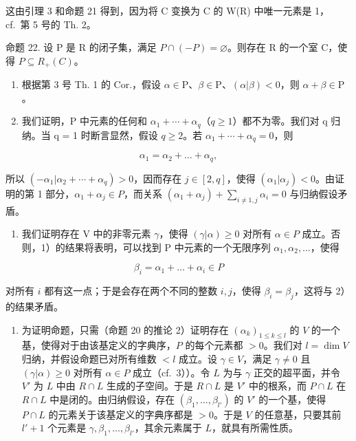 这由引理 3 和命题 21 得到，因为将 C 变换为 C 的 W(R) 中唯一元素是 1，cf.~第 5 号的 Th. 2。

命题 22. 设 P 是 R 的闭子集，满足 \(P \cap (-P) = \varnothing\)。则存在 R 的一个室 C，使得 \(P \subseteq R_{+}(C)\)。

\begin{enumerate}
\def\labelenumi{\arabic{enumi})}
\item
  根据第 3 号 Th. 1 的 Cor.，假设 \(\alpha \in \mathrm{P}\)、\(\beta \in \mathrm{P}\)、\((\alpha |\beta) < 0\)，则 \(\alpha + \beta \in \mathrm{P}\)。
\item
  我们证明，P 中元素的任何和 \(\alpha_{1} + \cdots + \alpha_{q}\)（\(q \geqslant 1\)）都不为零。我们对 q 归纳。当 q = 1 时断言显然，假设 \(q \geqslant 2\)。若 \(\alpha_{1} + \cdots + \alpha_{q} = 0\)，则
\end{enumerate}

\[
\alpha_ {1} = \alpha_ {2} + \dots + \alpha_ {q},
\]

所以 \((-\alpha_{1}|\alpha_{2}+\cdots+\alpha_{q})>0\)，因而存在 \(j\in[2,q]\)，使得 \((\alpha_{1}|\alpha_{j})<0\)。由证明的第 1 部分，\(\alpha_{1}+\alpha_{j}\in P\)，而关系 \((\alpha_{1}+\alpha_{j})+\sum_{i\neq1,j}\alpha_{i}=0\) 与归纳假设矛盾。

\begin{enumerate}
\def\labelenumi{\arabic{enumi})}
\setcounter{enumi}{2}
\tightlist
\item
  我们证明存在 V 中的非零元素 \(\gamma\)，使得 \((\gamma|\alpha) \geqslant 0\) 对所有 \(\alpha \in P\) 成立。否则，1）的结果将表明，可以找到 P 中元素的一个无限序列 \(\alpha_{1}, \alpha_{2}, \ldots\)，使得
\end{enumerate}

\[
\beta_ {i} = \alpha_ {1} + \dots + \alpha_ {i} \in P
\]

对所有 \(i\) 都有这一点；于是会存在两个不同的整数 \(i, j\)，使得 \(\beta_{i} = \beta_{j}\)，这将与 2）的结果矛盾。

\begin{enumerate}
\def\labelenumi{\arabic{enumi})}
\setcounter{enumi}{3}
\tightlist
\item
  为证明命题，只需（命题 20 的推论 2）证明存在 \((\alpha_{k})_{1\leqslant k\leqslant l}\) 的 \(V\) 的一个基，使得对于由该基定义的字典序，\(P\) 的每个元素都 \(>0\)。我们对 \(l = \dim V\) 归纳，并假设命题已对所有维数 \(< l\) 成立。设 \(\gamma \in V\)，满足 \(\gamma \neq 0\) 且 \((\gamma |\alpha)\geqslant 0\) 对所有 \(\alpha \in P\) 成立（cf.~3））。令 \(L\) 为与 \(\gamma\) 正交的超平面，并令 \(V'\) 为 \(L\) 中由 \(R\cap L\) 生成的子空间。于是 \(R\cap L\) 是 \(V'\) 中的根系，而 \(P\cap L\) 在 \(R\cap L\) 中是闭的。由归纳假设，存在 \((\beta_{1},\ldots ,\beta_{l'})\) 的 \(V'\) 的一个基，使得 \(P\cap L\) 的元素关于该基定义的字典序都是 \(>0\)。于是 \(V\) 的任意基，只要其前 \(l' + 1\) 个元素是 \(\gamma ,\beta_{1},\ldots ,\beta_{l'}\)，其余元素属于 \(L\)，就具有所需性质。
\end{enumerate}

